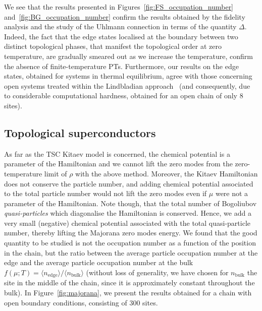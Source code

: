 We see that the results presented in Figures~\ref{fig:FS_occupation_number} and~\ref{fig:BG_occupation_number} confirm the results obtained by the fidelity analysis and the study of the Uhlmann connection in terms of the quantity $\Delta$. Indeed, the fact that the edge states localised at the boundary between two distinct topological phases, that manifest the topological order at zero temperature, are gradually smeared out as we increase the temperature, confirm the absence of finite-temperature PTs. Furthermore, our results on the edge states, obtained for systems in thermal equilibrium, agree with those concerning open systems treated within the Lindbladian approach~\cite{viy:riv:del:12} (and consequently, due to considerable computational hardness, obtained for an open chain of only 8 sites).

\subsection{Topological superconductors}
\label{sec:edgeTSC}
 As far as the TSC Kitaev model is concerned, the chemical potential is a parameter of the Hamiltonian and we cannot lift the zero modes from the zero-temperature limit of $\rho$ with the above method. Moreover, the Kitaev Hamiltonian does not conserve the particle number, and adding chemical potential associated to the total particle number would not lift the zero modes even if $\mu$ were not a parameter of the Hamiltonian.  Note though, that the total number of Bogoliubov {\em quasi-particles} which diagonalise the Hamiltonian is conserved. Hence, we add a very small (negative) chemical potential associated with the total quasi-particle number, thereby lifting the Majorana zero modes energy.  We found that the good quantity to be studied is not the occupation number as a function of the position in the chain, but the ratio between the average particle occupation number at the edge and the average particle occupation number at the bulk $f(\mu;T) = \langle n_{\text{edge}}\rangle/\langle n_{\text{bulk}}\rangle$ (without loss of generality, we have chosen for $n_{\text{bulk}}$ the site in the middle of the chain, since it is approximately constant throughout the bulk). 
 In Figure~\ref{fig:majorana}, we present the results obtained for a chain with open boundary conditions, consisting of 300 sites.
 

